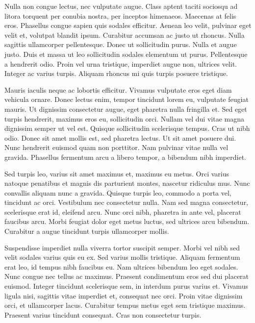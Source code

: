 Nulla non congue lectus, nec vulputate augue. Class aptent taciti sociosqu ad litora torquent per conubia nostra, per inceptos himenaeos. Maecenas at felis eros. Phasellus congue sapien quis sodales efficitur. Aenean leo velit, pulvinar eget velit et, volutpat blandit ipsum. Curabitur accumsan ac justo ut rhoncus. Nulla sagittis ullamcorper pellentesque. Donec ut sollicitudin purus. Nulla et augue justo. Duis et massa ut leo sollicitudin sodales elementum ut purus. Pellentesque a hendrerit odio. Proin vel urna tristique, imperdiet augue non, ultrices velit. Integer ac varius turpis. Aliquam rhoncus mi quis turpis posuere tristique.

Mauris iaculis neque ac lobortis efficitur. Vivamus vulputate eros eget diam vehicula ornare. Donec lectus enim, tempor tincidunt lorem eu, vulputate feugiat mauris. Ut dignissim consectetur augue, eget pharetra nulla fringilla et. Sed eget turpis hendrerit, maximus eros eu, sollicitudin orci. Nullam vel dui vitae magna dignissim semper ut vel est. Quisque sollicitudin scelerisque tempus. Cras ut nibh odio. Donec sit amet mollis est, sed pharetra lectus. Ut sit amet posuere dui. Nunc hendrerit euismod quam non porttitor. Nam pulvinar vitae nulla vel gravida. Phasellus fermentum arcu a libero tempor, a bibendum nibh imperdiet.

Sed turpis leo, varius sit amet maximus et, maximus eu metus. Orci varius natoque penatibus et magnis dis parturient montes, nascetur ridiculus mus. Nunc convallis aliquam nunc a gravida. Quisque turpis leo, commodo a porta vel, tincidunt ac orci. Vestibulum nec consectetur nulla. Nam sed magna consectetur, scelerisque erat id, eleifend arcu. Nunc orci nibh, pharetra in ante vel, placerat faucibus arcu. Morbi feugiat dolor eget metus luctus, sed ultrices arcu bibendum. Curabitur a augue tincidunt turpis ullamcorper mollis.

Suspendisse imperdiet nulla viverra tortor suscipit semper. Morbi vel nibh sed velit sodales varius quis eu ex. Sed varius mollis tristique. Aliquam fermentum erat leo, id tempus nibh faucibus eu. Nam ultrices bibendum leo eget sodales. Nunc congue nec tellus ac maximus. Praesent condimentum eros sed dui placerat euismod. Integer tincidunt scelerisque sem, in interdum purus varius et. Vivamus ligula nisi, sagittis vitae imperdiet et, consequat nec orci. Proin vitae dignissim orci, et ullamcorper lacus. Curabitur tempus metus eget sem tristique maximus. Praesent varius tincidunt consequat. Cras non consectetur turpis.

